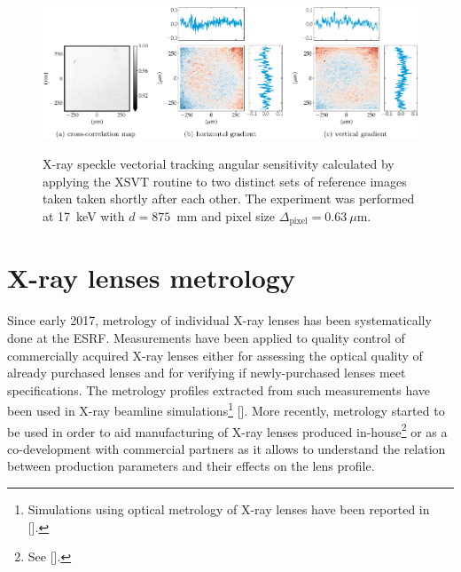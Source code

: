 \begin{refsection}
\begin{figure}[t]
        \centering
        {\includegraphics[width=0.875\linewidth]{figures/ch04b/sensitivity_3b.pdf}}
        \caption[XSVT experimental sensitivity calculation]{X-ray speckle vectorial tracking angular sensitivity calculated by applying the XSVT routine to two distinct sets of reference images taken taken shortly after each other. The experiment was performed at 17~keV with $d=875$~mm and pixel size $\Delta_\text{pixel}= 0.63~\mu$m.}\label{fig:sensitivity_3}
\end{figure}
\section{X-ray lenses metrology}\label{sec:metrology}

Since early 2017, metrology of individual X-ray lenses has been systematically done at the ESRF. Measurements have been applied to quality control of commercially acquired X-ray lenses either for assessing the optical quality of already purchased lenses and for verifying if newly-purchased lenses meet specifications. The metrology profiles extracted from such measurements have been used in X-ray beamline simulations\footnote{Simulations using optical metrology of X-ray lenses have been reported in [\cite{Chubar2020}].} [\cite{Celestre2020}]. More recently, metrology started to be used in order to aid manufacturing of X-ray lenses produced in-house\footnote{See [\cite{Celestre2020c}].} or as a co-development with commercial partners as it allows to understand the relation between production parameters and their effects on the lens profile.


\end{refsection}
